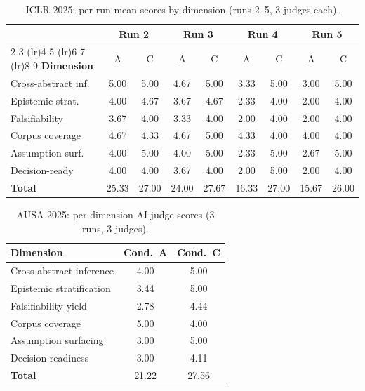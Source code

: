 \documentclass{article}
\begin{document}
\begin{table}[h]
\caption{ICLR 2025: per-run mean scores by dimension (runs 2--5, 3 judges each).}
\label{tab:iclr_detail}
\begin{center}
\begin{tabular}{lcccccccc}
\toprule
& \multicolumn{2}{c}{\textbf{Run 2}} & \multicolumn{2}{c}{\textbf{Run 3}} & \multicolumn{2}{c}{\textbf{Run 4}} & \multicolumn{2}{c}{\textbf{Run 5}} \\
\cmidrule(lr){2-3} \cmidrule(lr){4-5} \cmidrule(lr){6-7} \cmidrule(lr){8-9}
\textbf{Dimension} & A & C & A & C & A & C & A & C \\
\midrule
Cross-abstract inf.  & 5.00 & 5.00 & 4.67 & 5.00 & 3.33 & 5.00 & 3.00 & 5.00 \\
Epistemic strat. & 4.00 & 4.67 & 3.67 & 4.67 & 2.33 & 4.00 & 2.00 & 4.00 \\
Falsifiability   & 3.67 & 4.00 & 3.33 & 4.00 & 2.00 & 4.00 & 2.00 & 4.00 \\
Corpus coverage  & 4.67 & 4.33 & 4.67 & 5.00 & 4.33 & 4.00 & 4.00 & 4.00 \\
Assumption surf. & 4.00 & 5.00 & 4.00 & 5.00 & 2.33 & 5.00 & 2.67 & 5.00 \\
Decision-ready   & 4.00 & 4.00 & 3.67 & 4.00 & 2.00 & 5.00 & 2.00 & 4.00 \\
\midrule
\textbf{Total}   & 25.33 & 27.00 & 24.00 & 27.67 & 16.33 & 27.00 & 15.67 & 26.00 \\
\bottomrule
\end{tabular}
\end{center}
\end{table}

\begin{table}[h]
\caption{AUSA 2025: per-dimension AI judge scores (3 runs, 3 judges).}
\label{tab:ausa_detail}
\begin{center}
\begin{tabular}{lcc}
\toprule
\textbf{Dimension} & \textbf{Cond.\ A} & \textbf{Cond.\ C} \\
\midrule
Cross-abstract inference & 4.00 & 5.00 \\
Epistemic stratification & 3.44 & 5.00 \\
Falsifiability yield & 2.78 & 4.44 \\
Corpus coverage & 5.00 & 4.00 \\
Assumption surfacing & 3.00 & 5.00 \\
Decision-readiness & 3.00 & 4.11 \\
\midrule
\textbf{Total} & 21.22 & 27.56 \\
\bottomrule
\end{tabular}
\end{center}
\end{table}
\end{document}

